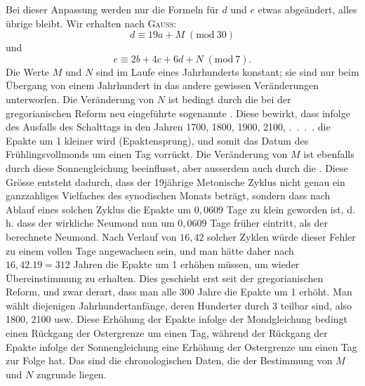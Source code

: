Bei dieser Anpassung werden nur die Formeln für $d$ und $e$ etwas abgeändert, alles übrige bleibt. Wir erhalten nach \textsc{Gauss}:
\[
d\equiv19a+M\; (\mathrm{mod}\ 30)
\]
\noindent und
\[
e\equiv2b+4c+6d+N\; (\mathrm{mod}\ 7).
\]
\noindent Die Werte $M$ und $N$ sind im Laufe eines Jahrhunderts konstant; sie sind
nur beim Übergang von einem Jahrhundert in das andere gewissen Veränderungen unterworfen. Die Veränderung von $N$ ist bedingt durch die bei der
\clearpage{}
\noindent gregorianischen Reform neu eingeführte sogenannte . Diese bewirkt, dass infolge des Ausfalls des Schalttags in den Jahren
1700, 1800, 1900, 2100, .\ .\ .\ . die Epakte um 1 kleiner wird (Epaktensprung),
und somit das Datum des Frühlingsvollmonds um einen Tag vorrückt. Die
Veränderung von $M$ ist ebenfalls durch diese Sonnengleichung beeinflusst, aber
ausserdem auch durch die . Diese Grösse entsteht dadurch,
dass der 19jährige Metonische Zyklus nicht genau ein ganzzahliges Vielfaches
des synodischen Monats beträgt, sondern dass nach Ablauf eines solchen
Zyklus die Epakte um $0{,}0609$ Tage zu klein geworden ist, d. h. dass der wirkliche Neumond nun um $0{,}0609$ Tage früher eintritt, als der berechnete  Neumond. Nach Verlauf von $16{,}42$ solcher Zyklen würde
dieser Fehler zu einem vollen Tage angewachsen sein, und man hätte daher
nach $16{,}42\mathord{.}19=312$ Jahren die Epakte um 1 erhöhen müssen, um wieder
Übereinstimmung zu erhalten. Dies geschieht erst seit der gregorianischen
Reform, und zwar derart, dass man alle 300 Jahre die Epakte um 1 erhöht.
Man wählt diejenigen Jahrhundertanfänge, deren Hunderter durch 3 teilbar
sind, also 1800, 2100 usw. Diese Erhöhung der Epakte infolge der Mondgleichung bedingt einen Rückgang der Ostergrenze um einen Tag, während
der Rückgang der Epakte infolge der Sonnengleichung eine Erhöhung der
Ostergrenze um einen Tag zur Folge hat. Das sind die chronologischen
Daten, die der Bestimmung von $M$ und $N$ zugrunde liegen.

